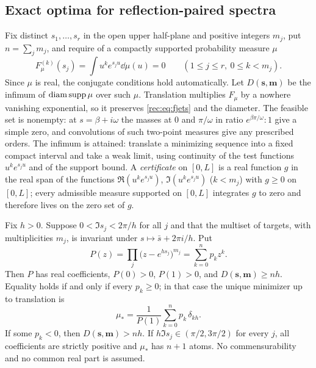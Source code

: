 \subsection{Exact optima for reflection-paired spectra}\label{fil:sec:reflect}

Fix distinct $s_1,\dots,s_r$ in the open upper half-plane and positive integers $m_j$, put
$n=\sum_jm_j$, and require of a compactly supported probability measure $\mu$
\begin{equation}\label{rec:eq:fjets}
 F_\mu^{(k)}(s_j)=\int u^ke^{s_ju}\dd\mu(u)=0\qquad(1\le j\le r,\ 0\le k<m_j).
\end{equation}
Since $\mu$ is real, the conjugate conditions hold automatically. Let $D(\boldsymbol s,\boldsymbol m)$
be the infimum of $\operatorname{diam}\operatorname{supp}\mu$ over such $\mu$. Translation multiplies $F_\mu$ by a
nowhere vanishing exponential, so it preserves \eqref{rec:eq:fjets} and the diameter. The feasible
set is nonempty: at $s=\beta+i\omega$ the masses at $0$ and $\pi/\omega$ in ratio $e^{\beta\pi/\omega}:1$
give a simple zero, and convolutions of such two-point measures give any prescribed orders. The
infimum is attained: translate a minimizing sequence into a fixed compact interval and take a weak
limit, using continuity of the test functions $u^ke^{s_ju}$ and of the support bound. A
\emph{certificate} on $[0,L]$ is a real function $g$ in the real span of the functions
$\Re(u^ke^{s_ju})$, $\Im(u^ke^{s_ju})$ ($k<m_j$) with $g\ge0$ on $[0,L]$; every admissible measure
supported on $[0,L]$ integrates $g$ to zero and therefore lives on the zero set of $g$.

\begin{theorem}\label{fil:thm:reflect}
Fix $h>0$. Suppose $0<\Im s_j<2\pi/h$ for all $j$ and that the multiset of targets, with
multiplicities $m_j$, is invariant under $s\mapsto\bar s+2\pi i/h$. Put
\[
 P(z)=\prod_j\bigl(z-e^{hs_j}\bigr)^{m_j}=\sum_{k=0}^np_kz^k .
\]
Then $P$ has real coefficients, $P(0)>0$, $P(1)>0$, and $D(\boldsymbol s,\boldsymbol m)\ge nh$.
Equality holds if and only if every $p_k\ge0$; in that case the unique minimizer up to translation is
\[
 \mu_*=\frac1{P(1)}\sum_{k=0}^np_k\,\delta_{kh}.
\]
If some $p_k<0$, then $D(\boldsymbol s,\boldsymbol m)>nh$. If $h\Im s_j\in(\pi/2,3\pi/2)$ for every
$j$, all coefficients are strictly positive and $\mu_*$ has $n+1$ atoms. No commensurability and no
common real part is assumed.
\end{theorem}

